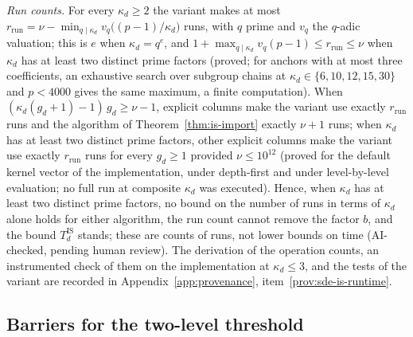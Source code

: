 \begin{remark}
\emph{Run counts.} For every $\kappa_d \ge 2$ the variant makes at most $r_{\mathrm{run}} = \nu - \min_{q \mid \kappa_d} v_q\bigl((p-1)/\kappa_d\bigr)$ runs, with $q$ prime and $v_q$ the $q$-adic valuation; this is $e$ when $\kappa_d = q^e$, and $1 + \max_{q \mid \kappa_d} v_q(p-1) \le r_{\mathrm{run}} \le \nu$ when $\kappa_d$ has at least two distinct prime factors (proved; for anchors with at most three coefficients, an exhaustive search over subgroup chains at $\kappa_d \in \{6,10,12,15,30\}$ and $p < 4000$ gives the same maximum, a finite computation). When $(\kappa_d(g_d+1)-1)\,g_d \ge \nu-1$, explicit columns make the variant use exactly $r_{\mathrm{run}}$ runs and the algorithm of Theorem~\ref{thm:is-import} exactly $\nu+1$ runs; when $\kappa_d$ has at least two distinct prime factors, other explicit columns make the variant use exactly $r_{\mathrm{run}}$ runs for every $g_d \ge 1$ provided $\nu \le 10^{12}$ (proved for the default kernel vector of the implementation, under depth-first and under level-by-level evaluation; no full run at composite $\kappa_d$ was executed). Hence, when $\kappa_d$ has at least two distinct prime factors, no bound on the number of runs in terms of $\kappa_d$ alone holds for either algorithm, the run count cannot remove the factor $b$, and the bound $T^{\mathrm{IS}}_d$ stands; these are counts of runs, not lower bounds on time (AI-checked, pending human review). The derivation of the operation counts, an instrumented check of them on the implementation at $\kappa_d\le 3$, and the tests of the variant are recorded in Appendix~\ref{app:provenance}, item~\ref{prov:sde-is-runtime}.
\end{remark}

\subsection{Barriers for the two-level threshold}
\label{app:sde-side-barrier}

